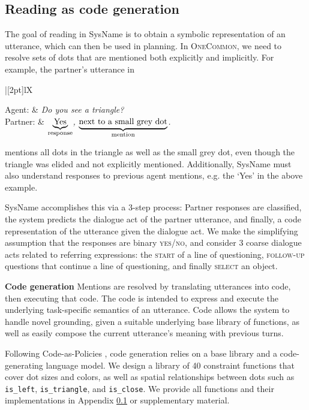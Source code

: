 \documentclass[11pt]{article}
\newcommand{\system}{SysName}
\newenvironment{Dialogue}[1][\small]{
    #1
    \def\arraystretch{1.3}
    \setlength\tabcolsep{7pt}
    \taburulecolor{lightgray}
    \vspace{.8em}
    \noindent
    \begin{tabu} to \columnwidth {|[2pt]lX}
}{
    \end{tabu}
    \vspace{.5em}
}
\newcommand{\Partner}[1]{Partner: & \UserUtt{#1} \\}
\newcommand{\AgentSay}[1]{Agent: & \AgentUtt{#1} \\}
\newcommand{\UserUtt}[1]{\textit{#1}}
\newcommand{\AgentUtt}[1]{\textit{#1}}
\newcommand{\justin}[1]{{{\textcolor{purple}{(Justin: #1)}}}}
\begin{document}
\subsection{Reading as code generation}
The goal of reading in \system{} is to obtain a symbolic representation of an utterance, which can then be used in planning.
In \textsc{OneCommon}, we need to resolve sets of dots that are mentioned both explicitly and implicitly. For example, the partner's utterance in

\begin{Dialogue}
    \AgentSay{Do you see a triangle?}
    \Partner{$\underbrace{\text{Yes}}_{\text{\normalfont response}}$, $\underbrace{\text{next to a small grey dot}}_{\text{\normalfont mention}}$.}
\end{Dialogue}%

\noindent mentions all dots in the triangle as well as the small grey dot, even though the triangle was elided and not explicitly mentioned.
Additionally, \system{} must also understand responses to previous agent mentions, e.g. the `Yes' in the above example.

\system{} accomplishes this via a 3-step process:
Partner responses are classified, 
the system predicts the dialogue act of the partner utterance,
and finally, a code representation of the utterance given the dialogue act.
We make the simplifying assumption that the responses are binary \textsc{yes}/\textsc{no}, and consider 3 coarse dialogue acts related to referring expressions:
the \textsc{start} of a line of questioning,
\textsc{follow-up} questions that continue a line of questioning,
and finally \textsc{select} an object.

\textbf{Code generation}
Mentions are resolved by translating utterances into code, then executing that code.
The code is intended to express and execute the underlying task-specific semantics of an utterance.
Code allows the system to handle novel grounding, given a suitable underlying base library of functions,
as well as easily compose the current utterance's meaning with previous turns.

Following Code-as-Policies \citep{codeaspolicies2022},
code generation relies on a base library and a code-generating language model.
We design a library of 40 constraint functions that cover dot sizes and colors, as well as spatial relationships between dots such as \texttt{is\_left}, \texttt{is\_triangle}, and \texttt{is\_close}. We provide all functions and their implementations in Appendix \ref{} or supplementary material.
\end{document}
